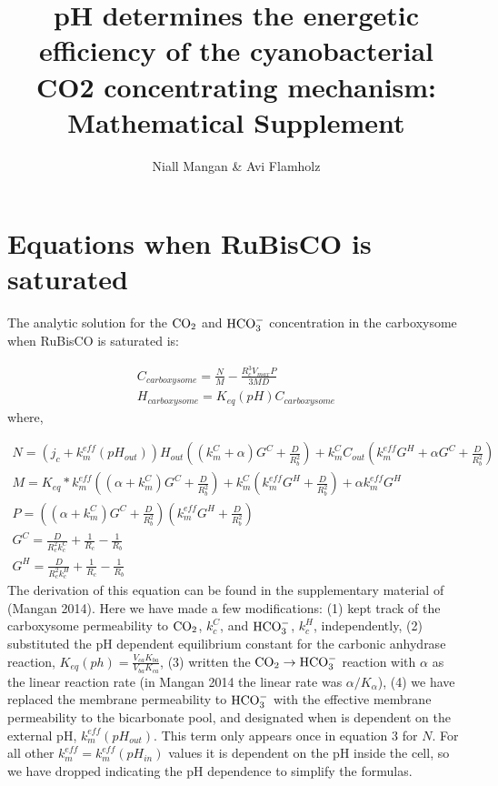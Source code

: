 \documentclass[]{article}
\title{pH determines the energetic efficiency of the cyanobacterial CO2 concentrating mechanism: Mathematical Supplement}
\author{Niall Mangan \& Avi Flamholz}
\begin{document}
\maketitle

\begin{abstract}
\end{abstract}


\section{Equations when RuBisCO is saturated}
The analytic solution for the ${\rm CO_2}$ and ${\rm HCO_3^-}$ concentration in the carboxysome when RuBisCO is saturated is:

\begin{eqnarray}
C_{carboxysome} = \frac{N}{M} - \frac{R_c^3 V_{max}P}{3 M D}\\
H_{carboxysome} = K_{eq}(pH) C_{carboxysome}
\end{eqnarray}
where,

\begin{eqnarray}
N = (j_c+k_m^{eff}(pH_{out}))H_{out}((k_m^C+\alpha)G^C+\frac{D}{R_b^2}) + k_m^C C_{out} (k_m^{eff} G^H +\alpha G^C+\frac{D}{R_b^2}) \\
M = K_{eq}*k_m^{eff}\left((\alpha+ k_m^C)G^C +  \frac{D}{R_b^2}\right)
+ k_m^C\left(k_m^{eff} G^H + \frac{D}{R_b^2}\right) + \alpha k_m^{eff} G^H \\
P = ((\alpha + k_m^C)G^C+\frac{D}{R_b^2})(k_m^{eff} G^H + \frac{D}{R_b^2}) \\
G^C = \frac{D}{R_c^2 k_c^C} + \frac{1}{R_c}-\frac{1}{R_b} \\
G^H = \frac{D}{R_c^2 k_c^H} + \frac{1}{R_c}-\frac{1}{R_b} 
\end{eqnarray}
The derivation of this equation can be found in the supplementary material of (Mangan 2014).   Here we have made a few modifications: (1) kept track of the carboxysome permeability to ${\rm CO_2}$, $k_c^C$, and ${\rm HCO_3^-}$, $k_c^H$, independently, (2) substituted the pH dependent equilibrium constant for the carbonic anhydrase reaction, $K_{eq}(ph) = \frac{V_{ca} K_{ba}}{V_{ba}K_{ca}}$, (3) written the ${\rm CO_2} \rightarrow {\rm HCO_3^-}$ reaction with $\alpha$ as the linear reaction rate (in Mangan 2014 the linear rate was $\alpha/K_\alpha$), (4) we have replaced the membrane permeability to ${\rm HCO_3^-}$ with the effective membrane permeability to the bicarbonate pool, and designated when is dependent on the external pH, $k_m^{eff}(pH_{out})$. This term only appears once in equation 3 for $N$. For all other $k_m^{eff} = k_m^{eff}(pH_{in})$ values it is dependent on the pH inside the cell, so we have dropped indicating the pH dependence to simplify the formulas.
\end{document}
